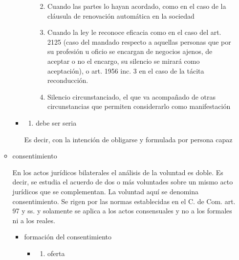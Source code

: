 \documentclass[]{article}
\providecommand{\tightlist}{%
  \setlength{\itemsep}{0pt}\setlength{\parskip}{0pt}}
\begin{document}
\begin{itemize}
\begin{itemize}
\begin{itemize}
\begin{itemize}
        \begin{enumerate}
        \def\labelenumi{\arabic{enumi}.}
        \tightlist
        \item
          Cuando las partes lo hayan acordado, como en el caso de la
          cláusula de renovación automática en la sociedad
        \item
          Cuando la ley le reconoce eficacia como en el caso del art.
          2125 (caso del mandado respecto a aquellas personas que por su
          profesión u oficio se encargan de negocios ajenos, de aceptar
          o no el encargo, su silencio se mirará como aceptación), o
          art. 1956 inc. 3 en el caso de la tácita reconducción.
        \item
          Silencio circunstanciado, el que va acompañado de otras
          circunstancias que permiten considerarlo como manifestación
        \end{enumerate}
      \end{itemize}
    \item
      \begin{enumerate}
      \def\labelenumi{\alph{enumi})}
      \setcounter{enumi}{1}
      \tightlist
      \item
        debe ser seria
      \end{enumerate}

      Es decir, con la intención de obligarse y formulada por persona
      capaz
    \end{itemize}
  \item
    consentimiento

    En los actos jurídicos bilaterales el análisis de la voluntad es
    doble. Es decir, se estudia el acuerdo de dos o más voluntades sobre
    un mismo acto jurídicos que se complementan. La voluntad aquí se
    denomina consentimiento. Se rigen por las normas establecidas en el
    C. de Com. art. 97 y ss. y solamente se aplica a los actos
    consensuales y no a los formales ni a los reales.

    \begin{itemize}
    \item
      formación del consentimiento

      \begin{itemize}
      \item
        \begin{enumerate}
        \def\labelenumi{\alph{enumi})}
        \tightlist
        \item
          oferta
        \end{enumerate}


\end{itemize}
\end{itemize}
\end{itemize}
\end{itemize}
\end{document}
